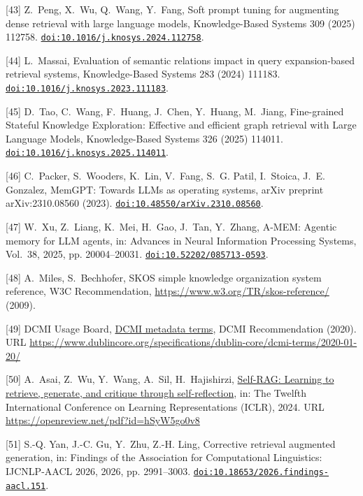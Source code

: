 [43] Z.~Peng, X.~Wu, Q.~Wang, Y.~Fang, {Soft prompt tuning for augmenting dense retrieval with large language models}, Knowledge-Based Systems 309 (2025) 112758. \href {https://doi.org/10.1016/j.knosys.2024.112758} {\texttt{doi:10.1016/j.knosys.2024.112758}}.

[44] L.~Massai, {Evaluation of semantic relations impact in query expansion-based retrieval systems}, Knowledge-Based Systems 283 (2024) 111183. \href {https://doi.org/10.1016/j.knosys.2023.111183} {\texttt{doi:10.1016/j.knosys.2023.111183}}.

[45] D.~Tao, C.~Wang, F.~Huang, J.~Chen, Y.~Huang, M.~Jiang, {Fine-grained Stateful Knowledge Exploration: Effective and efficient graph retrieval with Large Language Models}, Knowledge-Based Systems 326 (2025) 114011. \href {https://doi.org/10.1016/j.knosys.2025.114011} {\texttt{doi:10.1016/j.knosys.2025.114011}}.

[46] C.~Packer, S.~Wooders, K.~Lin, V.~Fang, S.~G. Patil, I.~Stoica, J.~E. Gonzalez, {MemGPT}: Towards {LLMs} as operating systems, arXiv preprint arXiv:2310.08560 (2023). \href {https://doi.org/10.48550/arXiv.2310.08560} {\texttt{doi:10.48550/arXiv.2310.08560}}.

[47] W.~Xu, Z.~Liang, K.~Mei, H.~Gao, J.~Tan, Y.~Zhang, {A-MEM}: Agentic memory for {LLM} agents, in: Advances in Neural Information Processing Systems, Vol.~38, 2025, pp. 20004--20031. \href {https://doi.org/10.52202/085713-0593} {\texttt{doi:10.52202/085713-0593}}.

[48] A.~Miles, S.~Bechhofer, {SKOS} simple knowledge organization system reference, W3C Recommendation, \url{https://www.w3.org/TR/skos-reference/} (2009).

[49] {DCMI Usage Board}, \href{https://www.dublincore.org/specifications/dublin-core/dcmi-terms/2020-01-20/}{{DCMI} metadata terms}, DCMI Recommendation (2020). URL \url{https://www.dublincore.org/specifications/dublin-core/dcmi-terms/2020-01-20/}

[50] A.~Asai, Z.~Wu, Y.~Wang, A.~Sil, H.~Hajishirzi, \href{https://openreview.net/pdf?id=hSyW5go0v8}{{Self-RAG}: Learning to retrieve, generate, and critique through self-reflection}, in: The Twelfth International Conference on Learning Representations ({ICLR}), 2024. URL \url{https://openreview.net/pdf?id=hSyW5go0v8}

[51] S.-Q. Yan, J.-C. Gu, Y.~Zhu, Z.-H. Ling, Corrective retrieval augmented generation, in: Findings of the Association for Computational Linguistics: IJCNLP-AACL 2026, 2026, pp. 2991--3003. \href {https://doi.org/10.18653/2026.findings-aacl.151} {\texttt{doi:10.18653/2026.findings-aacl.151}}.

